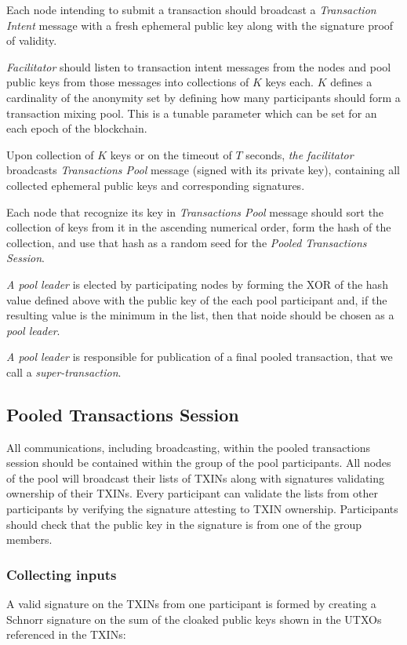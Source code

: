 \documentclass[a4paper, 10pt, conference]{ieeeconf}
\begin{document}
Each node intending to submit a transaction should broadcast a \textit{Transaction Intent} message with a fresh ephemeral public key along with the signature proof of validity.

\textit{Facilitator} should listen to transaction intent messages from the nodes and pool public keys from those messages into collections of $K$ keys each. $K$ defines a cardinality of the anonymity set by defining how many participants should form a transaction mixing pool. This is a tunable parameter which can be set for an each epoch of the blockchain. 

Upon collection of $K$ keys or on the timeout of $T$ seconds, \textit{the facilitator} broadcasts \textit{Transactions Pool} message (signed with its private key), containing all collected ephemeral public keys and corresponding signatures.

Each node that recognize its key in \textit{Transactions Pool} message should sort the collection of keys from it in the ascending numerical order, form the hash of the collection, and use that hash as a random seed for the \textit{Pooled Transactions Session}.

\textit{A pool leader} is elected by participating nodes by forming the XOR of the hash value defined above with the public key of the each pool participant and, if the resulting value is the minimum in the list, then that noide should be chosen as a \textit{pool leader}.

\textit{A pool leader} is responsible for publication of a final pooled transaction, that we call a \textit{super-transaction}.

\subsection{Pooled Transactions Session}

All communications, including broadcasting, within the pooled transactions session should be contained within the group of the pool participants.  All nodes of the pool will broadcast their lists of TXINs along with signatures validating ownership of their TXINs. Every participant can validate the lists from other participants by verifying the signature attesting to TXIN ownership. Participants should check that the public key in the signature is from one of the group members.

\subsubsection{Collecting inputs} A valid signature on the TXINs from one participant is formed by creating a Schnorr signature on the sum of the cloaked public keys shown in the UTXOs referenced in the TXINs:
\end{document}
